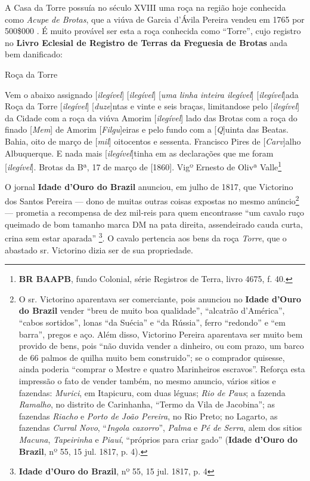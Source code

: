 A Casa da Torre possuía no século XVIII uma roça na região hoje conhecida como \textit{Acupe de Brotas}, que a viúva de Garcia d'Ávila Pereira vendeu em 1765 por 500\$000 \cite[p.~10]{ott_engenhos_1996}. É muito provável ser esta a roça conhecida como ``Torre'', cujo registro no \textbf{Livro Eclesial de Registro de Terras da Freguesia de Brotas} anda bem danificado:

\begin{citacao}
Roça da Torre

Vem o abaixo assignado [\textit{ilegível}] [\textit{ilegível}] [\textit{uma linha inteira ilegível}] [\textit{ilegível}]ada Roça da Torre [\textit{ilegível}] [\textit{duze}]ntas e vinte e seis braças, limitandose pelo [\textit{ilegível}] da Cidade com a roça da viúva Amorim [\textit{ilegível}] lado das Brotas com a roça do finado [\textit{Mem}] de Amorim [\textit{Filgu}]eiras e pelo fundo com a [\textit{Q}]uinta das Beatas. Bahia, oito de março de [\textit{mil}] oitocentos e sessenta. Francisco Pires de [\textit{Carv}]alho Albuquerque. E nada mais [\textit{ilegível}]tinha em as declarações que me foram [\textit{ilegível}]. Brotas da Bª, 17 de março de [1860]. Vigº Ernesto de Olivª Valle\footnote{\textbf{BR BAAPB}, fundo Colonial, série Registros de Terra, livro 4675, f. 40.}
\end{citacao}

O jornal \textbf{Idade d'Ouro do Brazil} anunciou, em julho de 1817, que Victorino dos Santos Pereira --- dono de muitas outras coisas expostas no mesmo anúncio\footnote{O sr. Victorino aparentava ser comerciante, pois anunciou no \textbf{Idade d'Ouro do Brazil} vender ``breu de muito boa qualidade'', ``alcatrão d'América'', ``cabos sortidos'', lonas ``da Suécia'' e ``da Rússia'', ferro ``redondo'' e ``em barra'', pregos e aço. Além disso, Victorino Pereira aparentava ser muito bem provido de bens, pois ``não duvida vender a dinheiro, ou com prazo, um barco de 66 palmos de quilha muito bem construido''; se o comprador quisesse, ainda poderia ``comprar o Mestre e quatro Marinheiros escravos''. Reforça esta impressão o fato de vender também, no mesmo anuncio, vários sitios e fazendas: \textit{Murici}, em Itapicuru, com duas léguas; \textit{Rio de Paus}; a fazenda \textit{Ramalho}, no distrito de Carinhanha, ``Termo da Vila de Jacobina''; as fazendas \textit{Riacho} e \textit{Porto de João Pereira}, no Rio Preto; no Lagarto, as fazendas \textit{Curral Novo}, ``\textit{Ingola caxorro}'', \textit{Palma} e \textit{Pé de Serra}, alem dos sitios \textit{Macuna}, \textit{Tapeirinha} e \textit{Piauí}, ``próprios para criar gado'' (\textbf{Idade d'Ouro do Brazil}, nº 55, 15 jul. 1817, p. 4).} --- prometia a recompensa de dez mil-reis para quem encontrasse ``um cavalo ruço queimado de bom tamanho marca DM na pata direita, assendeirado cauda curta, crina sem estar aparada'' \footnote{\textbf{Idade d'Ouro do Brazil}, nº 55, 15 jul. 1817, p. 4}. O cavalo pertencia aos bens da roça \textit{Torre}, que o abastado sr. Victorino dizia ser de sua propriedade.

